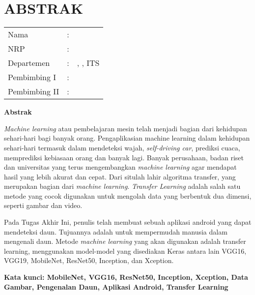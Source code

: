 \chapter {ABSTRAK}


\noindent\textbf{\MakeUppercase\judul}
\vspace*{1em}

\begin{tabularx}{\linewidth}{ l l X }
	Nama 			& : & \penulis \\
	NRP 			& :	& \nrp \\
	Departemen 		& : & \jurusan, \newline \fakultas, ITS \\
	Pembimbing I 	& : & \pembimbingsatu \\
	Pembimbing II 	& : & \pembimbingdua
	\vspace*{1em} 	%
\end {tabularx}

\noindent\textbf{Abstrak} \\
\itshape
\par \textit{Machine learning} atau pembelajaran mesin telah menjadi bagian dari kehidupan sehari-hari bagi banyak orang. Pengaplikasian machine learning dalam kehidupan sehari-hari termasuk dalam mendeteksi wajah, \textit{self-driving car}, prediksi cuaca, memprediksi kebiasaan orang dan banyak lagi. Banyak perusahaan, badan riset dan universitas yang terus mengembangkan \textit{machine learning} agar mendapat hasil yang lebih akurat dan cepat. Dari situlah lahir algoritma transfer, yang merupakan bagian dari \textit{machine learning}. \textit{Transfer Learning} adalah salah satu metode yang cocok digunakan untuk mengolah data yang berbentuk dua dimensi, seperti gambar dan video. 

\par Pada Tugas Akhir Ini, penulis telah membuat sebuah aplikasi android yang dapat mendeteksi daun. Tujuannya adalah untuk mempermudah manusia dalam mengenali daun. Metode \textit{machine learning} yang akan digunakan adalah transfer learning, menggunakan model-model yang disediakan Keras antara lain VGG16, VGG19, MobileNet, ResNet50, Inception, dan Xception.

\vspace*{1em}
\noindent\bfseries Kata kunci: MobileNet, VGG16, ResNet50, Inception, Xception, Data Gambar, Pengenalan Daun, Aplikasi Android, Transfer Learning
\normalfont
\cleardoublepage

